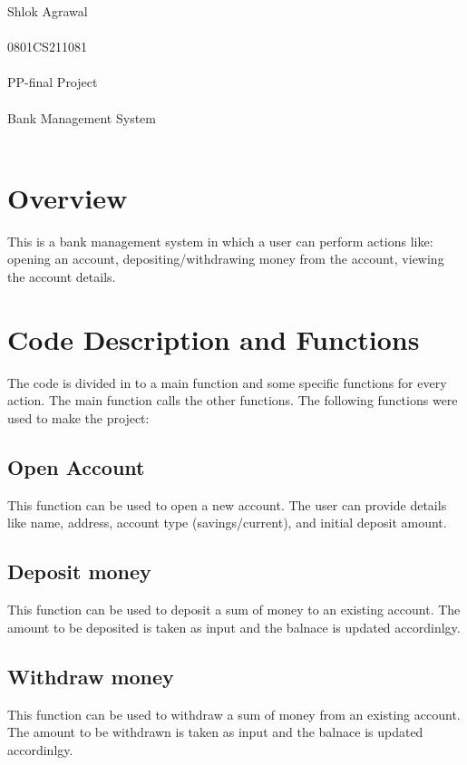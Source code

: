 \documentclass{article}
\begin{document}
\pagestyle{fancy}

\begin{center}
\begin{Huge}

Shlok Agrawal \\ \\
0801CS211081 \\ \\
PP-final Project \\ \\
Bank Management System\\ \\

\end{Huge}
\end{center}

\section{Overview}
This is a bank management system in which a user can perform actions like: opening an account, depositing/withdrawing money from the account, viewing the account details.
\section{Code Description and Functions}

The code is divided in to a main function and some specific functions for every action. The main function calls the other functions.
The following functions were used to make the project:


\subsection{Open Account}
This function can be used to open a new account. The user can provide details like name, address, account type (savings/current), and initial deposit amount.
\subsection{Deposit money}
This function can be used to deposit a sum of money to an existing account. The amount to be deposited is taken as input and the balnace is updated accordinlgy.
\subsection{Withdraw money}
This function can be used to withdraw a sum of money from an existing account. The amount to be withdrawn is taken as input and the balnace is updated accordinlgy.
\end{document}

